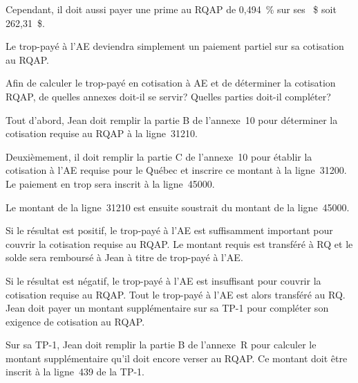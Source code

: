 Cependant, il doit aussi payer une prime au RQAP de 0,494~\% sur ses ~\$ soit 262,31~\$.

Le trop-payé à l'AE deviendra simplement un paiement partiel sur sa cotisation au RQAP.

\begin{sousQuestion}
	Afin de calculer le trop-payé en cotisation à AE et de déterminer la cotisation RQAP, de quelles annexes doit-il se servir? Quelles parties doit-il compléter?
\end{sousQuestion}
Tout d'abord, Jean doit remplir la partie B de l'annexe~10 pour déterminer la cotisation requise au RQAP à la ligne~31210.

Deuxièmement, il doit remplir la partie C de l'annexe~10 pour établir la cotisation à l'AE requise pour le Québec et inscrire ce montant à la ligne~31200. Le paiement en trop sera inscrit à la ligne~45000.

Le montant de la ligne~31210 est ensuite soustrait du montant de la ligne~45000.

Si le résultat est positif, le trop-payé à l'AE est suffisamment important pour couvrir la cotisation requise au RQAP. Le montant requis est transféré à RQ et le solde sera remboursé à Jean à titre de trop-payé à l'AE.

Si le résultat est négatif, le trop-payé à l'AE est insuffisant pour couvrir la cotisation requise au RQAP. Tout le trop-payé à l'AE est alors transféré au RQ. Jean doit payer un montant supplémentaire sur sa TP-1 pour compléter son exigence de cotisation au RQAP.

Sur sa TP-1, Jean doit remplir la partie B de l'annexe~R pour calculer le montant supplémentaire qu'il doit encore verser au RQAP. Ce montant doit être inscrit à la ligne~439 de la TP-1.

